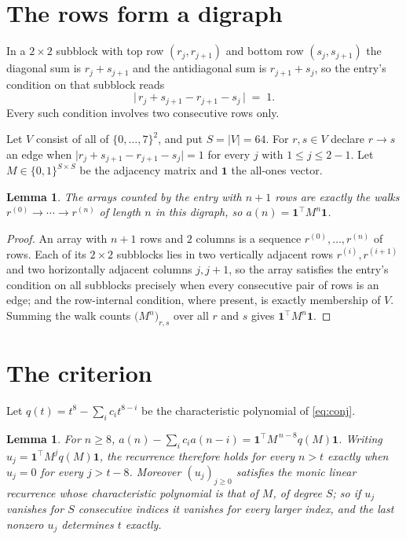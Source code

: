 \documentclass[11pt,a4paper]{article}
\theoremstyle{plain}
\newtheorem{lemma}[theorem]{Lemma}
\theoremstyle{definition}
\begin{document}
\section{The rows form a digraph}

In a $2\times2$ subblock with top row $(r_j,r_{j+1})$ and bottom row $(s_j,s_{j+1})$ the
diagonal sum is $r_j+s_{j+1}$ and the antidiagonal sum is $r_{j+1}+s_j$, so the entry's
condition on that subblock reads
\[
\bigl|\,r_j+s_{j+1}-r_{j+1}-s_j\,\bigr|\;=\;1.
\]
Every such condition involves two consecutive rows only.

Let $V$ consist of all of $\{0,\dots,7\}^{2}$, and put $S=|V|=64$. For $r,s\in V$ declare $r\to s$ an edge
when $\bigl|r_j+s_{j+1}-r_{j+1}-s_j\bigr|=1$ for every $j$ with
$1\le j\le2-1$. Let $M\in\{0,1\}^{S\times S}$ be the adjacency matrix and $\mathbf{1}$
the all-ones vector.

\begin{lemma}\label{lem:walk}
The arrays counted by the entry with $n+1$ rows are exactly the walks
$r^{(0)}\to\cdots\to r^{(n)}$ of length $n$ in this digraph, so
$a(n)=\mathbf{1}^{\!\top}M^{n}\mathbf{1}$.
\end{lemma}

\begin{proof}
An array with $n+1$ rows and $2$ columns is a sequence $r^{(0)},\dots,r^{(n)}$ of
rows. Each of its $2\times2$ subblocks lies in two vertically adjacent rows
$r^{(i)},r^{(i+1)}$ and two horizontally adjacent columns $j,j+1$, so the array satisfies
the entry's condition on all subblocks precisely when every consecutive pair of rows is an
edge; and the row-internal condition, where present, is exactly membership of $V$. Summing
the walk counts $\bigl(M^{n}\bigr)_{r,s}$ over all $r$ and $s$ gives
$\mathbf{1}^{\!\top}M^{n}\mathbf{1}$.
\end{proof}

\section{The criterion}

Let $q(t)=t^{8}-\sum_i c_i t^{8-i}$ be the characteristic polynomial of
\eqref{eq:conj}.

\begin{lemma}\label{lem:crit}
For $n\ge8$,
$a(n)-\sum_i c_i a(n-i)=\mathbf{1}^{\!\top}M^{\,n-8}q(M)\mathbf{1}$. Writing
$u_j=\mathbf{1}^{\!\top}M^{j}q(M)\mathbf{1}$, the recurrence therefore holds for every
$n>t$ exactly when $u_j=0$ for every $j>t-8$. Moreover $(u_j)_{j\ge0}$ satisfies the
monic linear recurrence whose characteristic polynomial is that of $M$, of degree $S$; so
if $u_j$ vanishes for $S$ consecutive indices it vanishes for every larger index, and the
last nonzero $u_j$ determines $t$ exactly.
\end{lemma}
\end{document}
